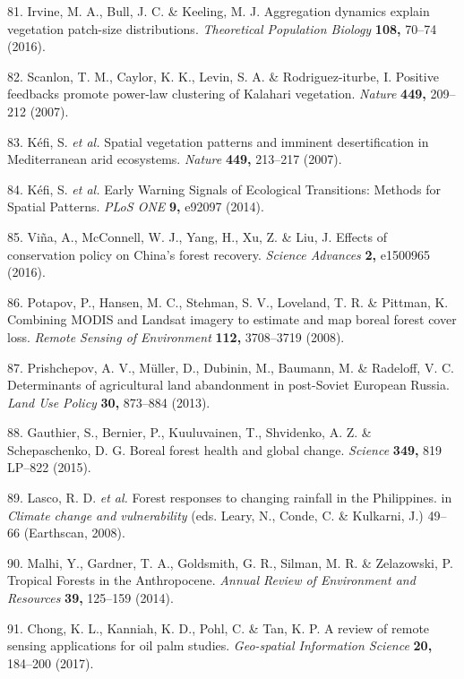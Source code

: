 \documentclass[]{article}
\begin{document}
\hypertarget{ref-Irvine2016}{}
81. Irvine, M. A., Bull, J. C. \& Keeling, M. J. Aggregation dynamics
explain vegetation patch-size distributions. \emph{Theoretical
Population Biology} \textbf{108,} 70--74 (2016).

\hypertarget{ref-Scanlon2007}{}
82. Scanlon, T. M., Caylor, K. K., Levin, S. A. \& Rodriguez-iturbe, I.
Positive feedbacks promote power-law clustering of Kalahari vegetation.
\emph{Nature} \textbf{449,} 209--212 (2007).

\hypertarget{ref-Kefi2007b}{}
83. Kéfi, S. \emph{et al.} Spatial vegetation patterns and imminent
desertification in Mediterranean arid ecosystems. \emph{Nature}
\textbf{449,} 213--217 (2007).

\hypertarget{ref-Kefi2014}{}
84. Kéfi, S. \emph{et al.} Early Warning Signals of Ecological
Transitions: Methods for Spatial Patterns. \emph{PLoS ONE} \textbf{9,}
e92097 (2014).

\hypertarget{ref-Vina2016}{}
85. Viña, A., McConnell, W. J., Yang, H., Xu, Z. \& Liu, J. Effects of
conservation policy on China's forest recovery. \emph{Science Advances}
\textbf{2,} e1500965 (2016).

\hypertarget{ref-Potapov2008a}{}
86. Potapov, P., Hansen, M. C., Stehman, S. V., Loveland, T. R. \&
Pittman, K. Combining MODIS and Landsat imagery to estimate and map
boreal forest cover loss. \emph{Remote Sensing of Environment}
\textbf{112,} 3708--3719 (2008).

\hypertarget{ref-Prishchepov2013}{}
87. Prishchepov, A. V., Müller, D., Dubinin, M., Baumann, M. \&
Radeloff, V. C. Determinants of agricultural land abandonment in
post-Soviet European Russia. \emph{Land Use Policy} \textbf{30,}
873--884 (2013).

\hypertarget{ref-Gauthier2015}{}
88. Gauthier, S., Bernier, P., Kuuluvainen, T., Shvidenko, A. Z. \&
Schepaschenko, D. G. Boreal forest health and global change.
\emph{Science} \textbf{349,} 819 LP--822 (2015).

\hypertarget{ref-Lasco2008}{}
89. Lasco, R. D. \emph{et al.} Forest responses to changing rainfall in
the Philippines. in \emph{Climate change and vulnerability} (eds. Leary,
N., Conde, C. \& Kulkarni, J.) 49--66 (Earthscan, 2008).

\hypertarget{ref-Malhi2014}{}
90. Malhi, Y., Gardner, T. A., Goldsmith, G. R., Silman, M. R. \&
Zelazowski, P. Tropical Forests in the Anthropocene. \emph{Annual Review
of Environment and Resources} \textbf{39,} 125--159 (2014).

\hypertarget{ref-Chong2017}{}
91. Chong, K. L., Kanniah, K. D., Pohl, C. \& Tan, K. P. A review of
remote sensing applications for oil palm studies. \emph{Geo-spatial
Information Science} \textbf{20,} 184--200 (2017).
\end{document}
